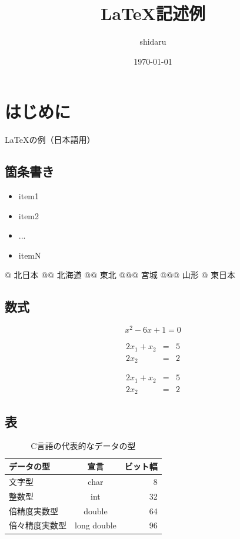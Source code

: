 \documentclass[uplatex]{jsarticle}
\begin{document}
\title{\Huge \LaTeX 記述例}
\author{shidaru}
\date{\today}
\maketitle

\section{はじめに}
\LaTeX の例（日本語用）

\subsection{箇条書き}
\begin{itemize}
  \item item1
  \item item2
  \item ...
  \item itemN
\end{itemize}

\begin{easylist}
 @ 北日本
 @@ 北海道
 @@ 東北
 @@@ 宮城
 @@@ 山形
 @ 東日本
\end{easylist}

\subsection{数式}
\begin{equation}
  x^2 - 6x + 1 = 0
\end{equation}

\begin{eqnarray}
  2x_1 + x_2 & = & 5 \\
  2x_2 & = & 2
\end{eqnarray}

\begin{eqnarray}
  2x_1 + x_2 & = & 5 \nonumber \\
  2x_2 & = & 2
\end{eqnarray}

\subsection{表}
\begin{table}[htp]
  \caption{C言語の代表的なデータの型}
  \label{table:data_type}
  \centering
  \begin{tabular}{lcr}
    \hline
    データの型  & 宣言  &  ビット幅  \\
    \hline \hline
    文字型  & char  & 8 \\
    整数型  & int   & 32 \\
    倍精度実数型  & double  & 64 \\
    倍々精度実数型  &  long double  &  96 \\
    \hline
  \end{tabular}
\end{table}
\end{document}
